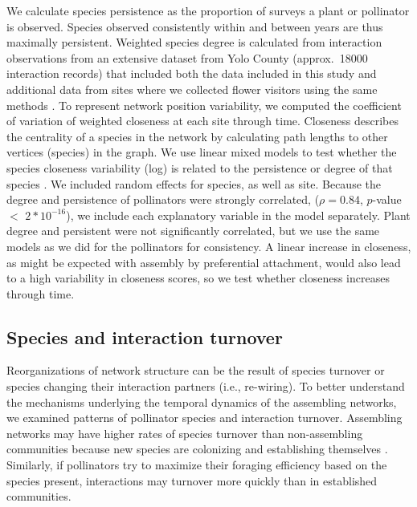 \documentclass[12pt]{article}
\begin{document}
We calculate species persistence as the proportion of surveys a plant
or pollinator is observed. Species observed consistently within and
between years are thus maximally persistent. Weighted species degree
is calculated from interaction observations from an extensive dataset
from Yolo County (approx.~18000 interaction records) that included
both the data included in this study and additional data from sites
where we collected flower visitors using the same methods
\citep{mgonigle-2015-x, ponisio2015farm}. To represent network
position variability, we computed the coefficient of variation of
weighted closeness at each site through time. Closeness describes the
centrality of a species in the network by calculating path lengths to
other vertices (species) in the graph. We use linear mixed models to
test whether the species closeness variability (log) is related to the
persistence or degree of that species \citep{lme4, lmetest}. We
included random effects for species, as well as site. Because the
degree and persistence of pollinators were strongly correlated, ($\rho
= 0.84$, $p$-value $<$ $2*10^{-16}$), we include each explanatory
variable in the model separately. Plant degree and persistent were not
significantly correlated, but we use the same models as we did for the
pollinators for consistency. A linear increase in closeness, as might
be expected with assembly by preferential attachment, would also lead
to a high variability in closeness scores, so we test whether
closeness increases through time.

\subsection*{Species and interaction turnover}

Reorganizations of network structure can be the result of species
turnover or species changing their interaction partners (i.e.,
re-wiring). To better understand the mechanisms underlying the
temporal dynamics of the assembling networks, we examined patterns of
pollinator species and interaction turnover. Assembling networks may
have higher rates of species turnover than non-assembling communities
because new species are colonizing and establishing themselves
\citep{mgonigle-2015-x}. Similarly, if pollinators try to maximize
their foraging efficiency based on the species present, interactions
may turnover more quickly than in established communities.
\end{document}
